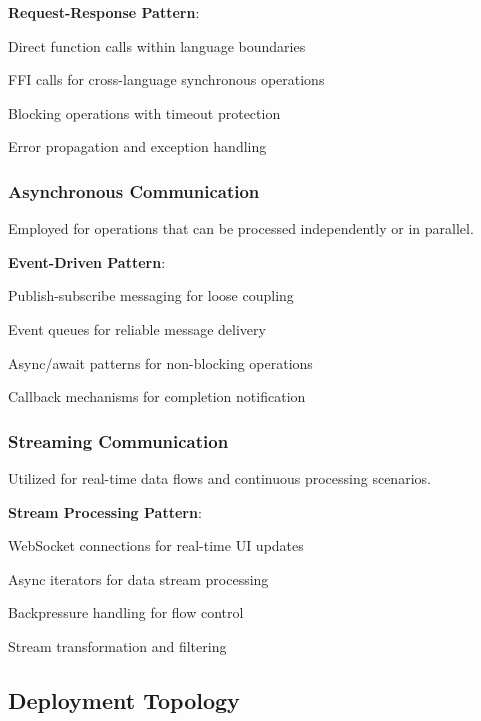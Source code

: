 \textbf{Request-Response Pattern}:
\begin{compactlist}
    \item Direct function calls within language boundaries
    \item FFI calls for cross-language synchronous operations
    \item Blocking operations with timeout protection
    \item Error propagation and exception handling
\end{compactlist}

\subsubsection*{Asynchronous Communication}

Employed for operations that can be processed independently or in parallel.

\textbf{Event-Driven Pattern}:
\begin{compactlist}
    \item Publish-subscribe messaging for loose coupling
    \item Event queues for reliable message delivery
    \item Async/await patterns for non-blocking operations
    \item Callback mechanisms for completion notification
\end{compactlist}

\subsubsection*{Streaming Communication}

Utilized for real-time data flows and continuous processing scenarios.

\textbf{Stream Processing Pattern}:
\begin{compactlist}
    \item WebSocket connections for real-time UI updates
    \item Async iterators for data stream processing
    \item Backpressure handling for flow control
    \item Stream transformation and filtering
\end{compactlist}

\subsection*{Deployment Topology}

